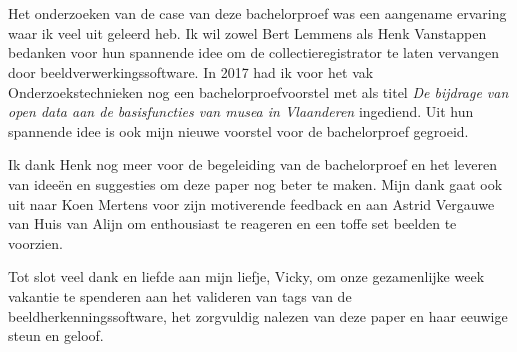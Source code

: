 
\chapter*{}
\label{ch:voorwoord}

Het onderzoeken van de case van deze bachelorproef was een aangename ervaring waar ik veel uit geleerd heb. Ik wil zowel Bert Lemmens als Henk Vanstappen bedanken voor hun spannende idee om de collectieregistrator te laten vervangen door beeldverwerkingssoftware. In 2017 had ik voor het vak Onderzoekstechnieken nog een bachelorproefvoorstel met als titel \textit{De bijdrage van open data aan de basisfuncties van musea in Vlaanderen} ingediend. Uit hun spannende idee is ook mijn nieuwe voorstel voor de bachelorproef gegroeid.

Ik dank Henk nog meer voor de begeleiding van de bachelorproef en het leveren van ideeën en suggesties om deze paper nog beter te maken. Mijn dank gaat ook uit naar Koen Mertens voor zijn motiverende feedback en aan Astrid Vergauwe van Huis van Alijn om enthousiast te reageren en een toffe set beelden te voorzien.

Tot slot veel dank en liefde aan mijn liefje, Vicky, om onze gezamenlijke week vakantie te spenderen aan het valideren van tags van de beeldherkenningssoftware, het zorgvuldig nalezen van deze paper en haar eeuwige steun en geloof.
